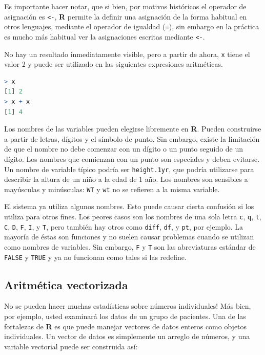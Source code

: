 \begin{tradnote}
	Es importante hacer notar, que si bien, por motivos históricos
	el operador de asignación es \texttt{<-}, \textbf{R} permite la definir una asignación
	de la forma habitual en otros lenguajes, mediante el operador de igualdad (\texttt{=}),
	sin embargo en la práctica es mucho más habitual ver la asignaciones
	escritas mediante \texttt{<-}.
\end{tradnote}

No hay un resultado inmediatamente visible, pero a partir de ahora,
\texttt{x} tiene el valor 2 y puede ser utilizado en las siguientes
expresiones aritméticas.

\begin{lstlisting}[language=R]
> x
[1] 2
> x + x
[1] 4
\end{lstlisting}

Los nombres de las variables pueden elegirse libremente en \textbf{R}.  Pueden
construirse a partir de letras, dígitos y el símbolo de punto.  Sin embargo,
existe la limitación de que el nombre no debe comenzar con un dígito o un punto
seguido de un dígito. Los nombres que comienzan con un punto son especiales y
deben evitarse. Un nombre de variable típico podría ser \texttt{height.1yr},
que podría utilizarse para describir la altura de un niño a la edad de 1 año.
Los nombres son sensibles a mayúsculas y minúsculas: \texttt{WT} y \texttt{wt}
no se refieren a la misma variable.

El sistema ya utiliza algunos nombres. Esto puede causar cierta confusión si
los utiliza para otros fines. Los peores casos son los nombres de una sola
letra \texttt{c}, \texttt{q}, \texttt{t}, \texttt{C}, \texttt{D}, \texttt{F},
\texttt{I}, y \texttt{T}, pero también hay otros como \texttt{diff},
\texttt{df}, y \texttt{pt}, por ejemplo.  La mayoría de éstas son funciones y
no suelen causar problemas cuando se utilizan como nombres de variables. Sin
embargo, \texttt{F} y \texttt{T} son las abreviaturas estándar de
\texttt{FALSE} y \texttt{TRUE} y ya no funcionan como tales si las redefine.

\subsection{Aritmética vectorizada}

No se pueden hacer muchas estadísticas sobre números individuales!  Más bien,
por ejemplo, usted examinará los datos de un grupo de pacientes.  Una de las
fortalezas de \textbf{R} es que puede manejar vectores de datos enteros como
objetos individuales.  Un vector de datos es simplemente un arreglo de números,
y una variable vectorial puede ser construida así:

